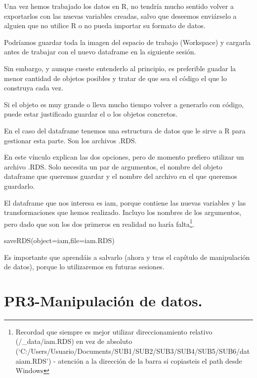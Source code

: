 \documentclass[
  letterpaper,
  DIV=11,
  numbers=noendperiod]{scrreprt}
\newenvironment{Shaded}{\begin{snugshade}}{\end{snugshade}}
\newcommand{\AttributeTok}[1]{\textcolor[rgb]{0.40,0.45,0.13}{#1}}
\newcommand{\FunctionTok}[1]{\textcolor[rgb]{0.28,0.35,0.67}{#1}}
\newcommand{\NormalTok}[1]{\textcolor[rgb]{0.00,0.23,0.31}{#1}}
\newcommand{\StringTok}[1]{\textcolor[rgb]{0.13,0.47,0.30}{#1}}
\begin{document}
Una vez hemos trabajado los datos en R, no tendría mucho sentido volver
a exportarlos con las nuevas variables creadas, salvo que deseemos
enviárselo a alguien que no utilice R o no pueda importar su formato de
datos.

Podríamos guardar toda la imagen del espacio de trabajo (Workspace) y
cargarla antes de trabajar con el nuevo dataframe en la siguiente
sesión.

Sin embargo, y aunque cueste entenderlo al principio, es preferible
guadar la menor cantidad de objetos posibles y tratar de que sea el
código el que lo construya cada vez.

Si el objeto es muy grande o lleva mucho tiempo volver a generarlo con
código, puede estar justificado guardar el o los objetos concretos.

En el caso del dataframe tenemos una estructura de datos que le sirve a
R para gestionar esta parte. Son los archivos .RDS.

En este vínculo explican las dos opciones, pero de momento prefiero
utilizar un archivo .RDS. Solo necesita un par de argumentos, el nombre
del objeto dataframe que queremos guardar y el nombre del archivo en el
que queremos guardarlo.

El dataframe que nos interesa es iam, porque contiene las nuevas
variables y las transformaciones que hemos realizado. Incluyo los
nombres de los argumentos, pero dado que son los dos primeros en
realidad no haría falta\footnote{Recordad que siempre es mejor utilizar
  direccionamiento relativo (/\_data/iam.RDS) en vez de absoluto
  (`C:/Users/Usuario/Documents/SUB1/SUB2/SUB3/SUB4/SUB5/SUB6/dataiam.RDS')
  - atención a la dirección de la barra si copiasteis el path desde
  Windows}.

\begin{Shaded}
\begin{Highlighting}[]
\FunctionTok{saveRDS}\NormalTok{(}\AttributeTok{object=}\NormalTok{iam,}\AttributeTok{file=}\StringTok{\textquotesingle{}iam.RDS\textquotesingle{}}\NormalTok{)}
\end{Highlighting}
\end{Shaded}

Es importante que aprendáis a salvarlo (ahora y tras el capítulo de
manipulación de datos), porque lo utilizaremos en futuras sesiones.


\hypertarget{pr3-manipulaciuxf3n-de-datos.}{%
\chapter{PR3-Manipulación de
datos.}\label{pr3-manipulaciuxf3n-de-datos.}}
\end{document}
